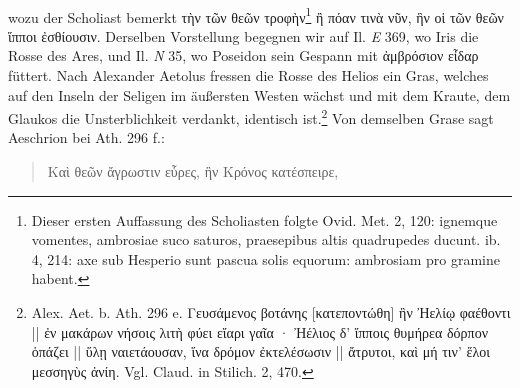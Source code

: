 \documentclass[a4paper, 11pt, oneside]{article}
\begin{document}
\paragraph{}
wozu der Scholiast bemerkt τὴν τῶν θεῶν τροφὴν\footnote{Dieser ersten Auffassung des Scholiasten folgte Ovid. Met. 2, 120: ignemque vomentes, ambrosiae suco saturos, praesepibus altis quadrupedes ducunt. ib. 4, 214: axe sub Hesperio sunt pascua solis equorum: ambrosiam pro gramine habent.} ἢ πόαν τινὰ νῦν, ἣν οἱ τῶν θεῶν ἵπποι ἐσθίουσιν. Derselben Vorstellung begegnen wir auf Il. \emph{E} 369, wo Iris die Rosse des Ares, und Il. \emph{N} 35, wo Poseidon sein Gespann mit ἀμβρόσιον εἶδαρ füttert. Nach Alexander Aetolus fressen die Rosse des Helios ein Gras, welches auf den Inseln der Seligen im äußersten Westen wächst und mit dem Kraute, dem Glaukos die Unsterblichkeit verdankt, identisch ist.\footnote{Alex. Aet. b. Ath. 296 e. Γευσάμενος βοτάνης [κατεποντώθη] ἣν Ἠελίῳ φαέθοντι || ἐν μακάρων νήσοις λιτὴ φύει εἴαρι γαῖα · Ἠέλιος δ' ἵπποις θυμήρεα δόρπον ὁπάζει || ὕλῃ ναιετάουσαν, ἵνα δρόμον ἐκτελέσωσιν || ἄτρυτοι, καὶ μή τιν' ἕλοι μεσσηγὺς ἀνίη. Vgl. Claud. in Stilich. 2, 470.} Von demselben Grase sagt Aeschrion bei Ath. 296 f.:
\begin{quotation}
Καὶ θεῶν ἄγρωστιν εὗρες, ἣν Κρόνος κατέσπειρε,
\end{quotation}
\end{document}
